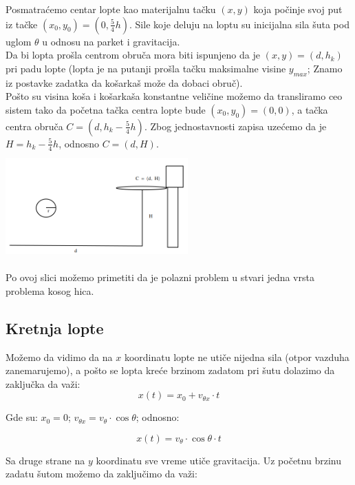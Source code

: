 \documentclass[a4paper, 12pt]{article}
\begin{document}
Posmatraćemo centar lopte kao materijalnu tačku $(x,y)$ koja počinje svoj put iz tačke $(x_0,y_0) = (0,\dfrac{_5}{^4}h)$. Sile koje deluju na loptu su inicijalna sila šuta pod uglom $\theta$ u odnosu na parket i gravitacija.\\

Da bi lopta prošla centrom obruča mora biti ispunjeno da je $(x,y) = (d,h_k)$ pri padu lopte (lopta je na putanji prošla tačku maksimalne visine $y_{max}$;
Znamo iz postavke zadatka da košarkaš može da dobaci obruč).\\

Pošto su visina koša i košarkaša konstantne veličine možemo da transliramo ceo sistem tako da početna tačka centra lopte bude $(x_0,y_0) = (0,0)$, a tačka centra obruča $C = (d,h_k-\dfrac{_5}{^4}h)$.
Zbog jednostavnosti zapisa uzećemo da je $H = h_k-\dfrac{_5}{^4}h$, odnosno $C = (d,H)$.\\


\includegraphics[width=7cm, height=4cm]{pic2} %

Po ovoj slici možemo primetiti da je polazni problem u stvari jedna vrsta problema kosog hica.

\subsection{Kretnja lopte}

Možemo da vidimo da na $x$ koordinatu lopte ne utiče nijedna sila (otpor vazduha zanemarujemo), a pošto se lopta kreće brzinom zadatom pri šutu dolazimo da zaključka da važi:\\

\[x(t) = x_0 + v_{\theta x}\cdot t\]

Gde su: $x_0 = 0$; $v_{\theta x} = v_\theta \cdot \cos \theta$; odnosno:

\[x(t) = v_\theta \cdot \cos \theta \cdot t\]

Sa druge strane na $y$ koordinatu sve vreme utiče gravitacija. Uz početnu brzinu zadatu šutom možemo da zaključimo da važi:
\end{document}

